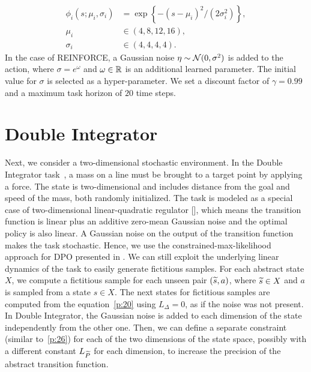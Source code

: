 \begin{align}
\phi_i(s; \mu_i, \sigma_i) &= \exp\left\{-{(s -\mu_i)^2}\big/{(2\sigma_i^2)}\right\}, \nonumber \\
\mu_i &\in (4, 8, 12, 16), \nonumber \\
\sigma_i &\in(4, 4, 4, 4). \nonumber
\end{align}
In the case of REINFORCE, a Gaussian noise $\eta\sim\mathcal{N}(0,\sigma^2)$ is added to the action, where $\sigma=e^{\omega}$ and $\omega\in\mathbb{R}$ is an additional learned parameter. The initial value for $\sigma$ is selected as a hyper-parameter.
We set a discount factor of $\gamma=0.99$ and a maximum task horizon of $20$ time steps.

\section{Double Integrator} \label{sec:mass}
Next, we consider a two-dimensional stochastic environment. In the Double Integrator task~\citep{recht2018tour}, a mass on a line must be brought to a target point by applying a force. The state is two-dimensional and includes distance from the goal and speed of the mass, both randomly initialized. The task is modeled as a special case of two-dimensional linear-quadratic regulator [\cite{peters2002policy}], which means the transition function is linear plus an additive zero-mean Gaussian noise and the optimal policy is also linear. A Gaussian noise on the output of the transition function makes the task stochastic. Hence, we use the constrained-max-likelihood approach for \ac{DPO} presented in . We can still exploit the underlying linear dynamics of the task to easily generate fictitious samples. For each abstract state $X$, we compute a fictitious sample for each unseen pair $(\widetilde{s}, a)$, where $\widetilde{s} \in X$ and $a$ is sampled from a state $s \in X$. The next states for fictitious samples are computed from the equation~\eqref{p:20} using $L_{\Delta}=0$, as if the noise was not present. In Double Integrator, the Gaussian noise is added to each dimension of the state independently from the other one. Then, we can define a separate constraint (similar to~\eqref{p:26}) for each of the two dimensions of the state space, possibly with a different constant $L_{\widetilde{P}}$ for each dimension, to increase the precision of the abstract transition function. \\

